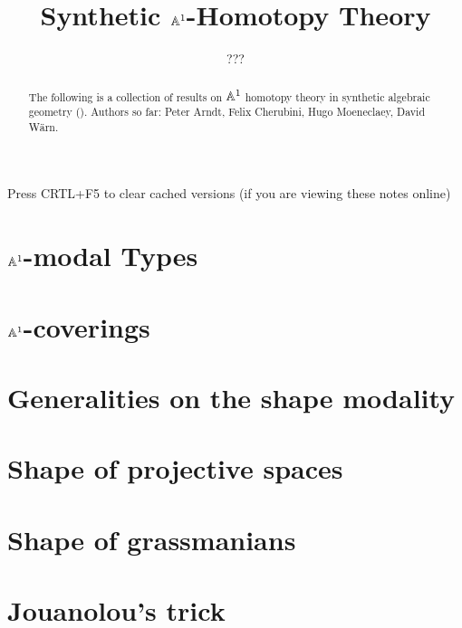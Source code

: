 \documentclass{../util/zariski}
\title{Synthetic $\mathbb{A}^1$-Homotopy Theory}
\author{???}
\begin{document}
\maketitle

\begin{center}
  \color{purple}
  \large{Press CRTL+F5 to clear cached versions}
  \large{(if you are viewing these notes online)}
\end{center}

\begin{abstract}
  The following is a collection of results on $\mathbb{A}^1$ homotopy theory in synthetic algebraic geometry (\cite{draft}).
  Authors so far: Peter Arndt, Felix Cherubini, Hugo Moeneclaey, David Wärn. 
\end{abstract}

\tableofcontents

\section{$\mathbb{A}^1$-modal Types}


%

\section{$\mathbb{A}^1$-coverings}


\section{Generalities on the shape modality}


\section{Shape of projective spaces}


\section{Shape of grassmanians}


\section{Jouanolou's trick}


\printindex

\printbibliography
\end{document}
